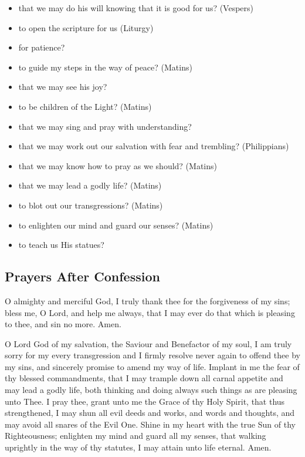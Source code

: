 \begin{itemize}
\begin{itemize}
  \item that we may do his will knowing that it is good for us? (Vespers)
  \item to open the scripture for us (Liturgy)
  \item for patience?
  \item to guide my steps in the way of peace? (Matins)
  \item that we may see his joy?
  \item to be children of the Light? (Matins)
  \item that we may sing and pray with understanding?
  \item that we may work out our salvation with fear and trembling? (Philippians)
  \item that we may know how to pray as we should? (Matins)
  \item that we may lead a godly life? (Matins)
  \item to blot out our transgressions? (Matins)
  \item to enlighten our mind and guard our senses? (Matins)
  \item to teach us His statues?
  \end{itemize}
\end{itemize}

\subsection{Prayers After Confession}

O almighty and merciful God, I truly thank thee for the forgiveness of my sins; bless me, O Lord, and help me always, that I may ever do that which is pleasing to thee, and sin no more. Amen.

O Lord God of my salvation, the Saviour and Benefactor of my soul, I am truly sorry for my every transgression and I firmly resolve never again to offend thee by my sins, and sincerely promise to amend my way of life. Implant in me the fear of thy blessed commandments, that I may trample down all carnal appetite and may lead a godly life, both thinking and doing always such things as are pleasing unto Thee. I pray thee, grant unto me the Grace of thy Holy Spirit, that thus strengthened, I may shun all evil deeds and works, and words and thoughts, and may avoid all snares of the Evil One. Shine in my heart with the true Sun of thy Righteousness; enlighten my mind and guard all my senses, that walking uprightly in the way of thy statutes, I may attain unto life eternal.  Amen.

